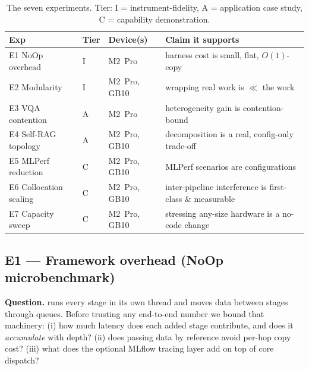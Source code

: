 \begin{table}[t]\centering\small
\caption{The seven experiments. Tier: I = instrument-fidelity,
A = application case study, C = capability demonstration.}
\label{tab:exp-overview}
\begin{tabular}{@{}llll@{}}
\toprule
Exp & Tier & Device(s) & Claim it supports \\
\midrule
E1 NoOp overhead      & I & M2~Pro          & harness cost is small, flat, $O(1)$-copy \\
E2 Modularity         & I & M2~Pro, GB10    & wrapping real work is $\ll$ the work \\
E3 VQA contention     & A & M2~Pro          & heterogeneity gain is contention-bound \\
E4 Self-RAG topology  & A & M2~Pro, GB10    & decomposition is a real, config-only trade-off \\
E5 MLPerf reduction   & C & M2~Pro, GB10    & MLPerf scenarios are \sysname{} configurations \\
E6 Collocation scaling& C & M2~Pro, GB10    & inter-pipeline interference is first-class \& measurable \\
E7 Capacity sweep     & C & M2~Pro, GB10    & stressing any-size hardware is a no-code change \\
\bottomrule
\end{tabular}
\end{table}

\subsection{E1 --- Framework overhead (NoOp microbenchmark)}
\label{sec:e1-noop}

\textbf{Question.} \sysname{} runs every stage in its own thread and moves
data between stages through queues. Before trusting any end-to-end number
we bound that machinery: (i) how much latency does each added stage
contribute, and does it \emph{accumulate} with depth? (ii) does passing
data by reference avoid per-hop copy cost? (iii) what does the optional
MLflow tracing layer add on top of core dispatch?

